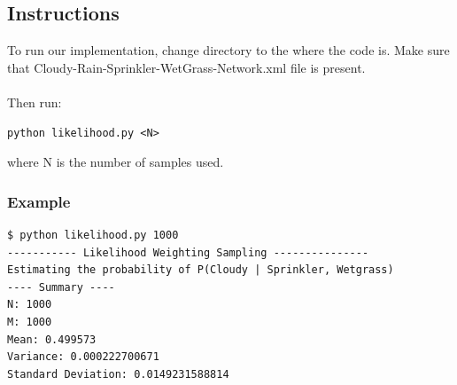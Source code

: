 \documentclass{article}
\begin{document}
\subsection{Instructions}
To run our implementation, change directory to the where the code is. Make sure that Cloudy-Rain-Sprinkler-WetGrass-Network.xml file is present.\\
\\
Then run:

\begin{lstlisting}
python likelihood.py <N>
\end{lstlisting}
where N is the number of samples used.\\

\subsubsection{Example}
\begin{lstlisting}
$ python likelihood.py 1000
----------- Likelihood Weighting Sampling ---------------
Estimating the probability of P(Cloudy | Sprinkler, Wetgrass)
---- Summary ----
N: 1000
M: 1000
Mean: 0.499573
Variance: 0.000222700671
Standard Deviation: 0.0149231588814

\end{lstlisting}
\end{document}
